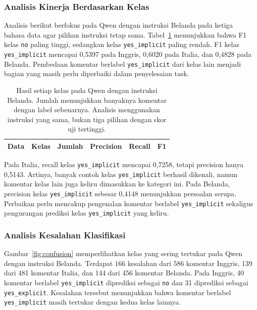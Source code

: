\documentclass[11pt]{article}
\begin{document}
\subsubsection{Analisis Kinerja Berdasarkan Kelas}
Analisis berikut berfokus pada Qwen dengan instruksi Belanda pada ketiga bahasa data agar pilihan instruksi tetap sama. Tabel~\ref{tab:classes} menunjukkan bahwa F1 kelas \texttt{no} paling tinggi, sedangkan kelas \texttt{yes\_implicit} paling rendah. F1 kelas \texttt{yes\_implicit} mencapai 0,5397 pada Inggris, 0,6020 pada Italia, dan 0,4828 pada Belanda. Pembedaan komentar berlabel \texttt{yes\_implicit} dari kelas lain menjadi bagian yang masih perlu diperbaiki dalam penyelesaian task.

\begin{table}[t]
\centering
\begin{tabular}{llrrrr}
\toprule
Data & Kelas & Jumlah & Precision & Recall & F1 \\
\midrule

\end{tabular}
\caption{Hasil setiap kelas pada Qwen dengan instruksi Belanda. Jumlah menunjukkan banyaknya komentar dengan label sebenarnya. Analisis menggunakan instruksi yang sama, bukan tiga pilihan dengan skor uji tertinggi.}
\label{tab:classes}
\end{table}

Pada Italia, recall kelas \texttt{yes\_implicit} mencapai 0,7258, tetapi precision hanya 0,5143. Artinya, banyak contoh kelas \texttt{yes\_implicit} berhasil dikenali, namun komentar kelas lain juga keliru dimasukkan ke kategori ini. Pada Belanda, precision kelas \texttt{yes\_implicit} sebesar 0,4148 menunjukkan persoalan serupa. Perbaikan perlu mencakup pengenalan komentar berlabel \texttt{yes\_implicit} sekaligus pengurangan prediksi kelas \texttt{yes\_implicit} yang keliru.

\subsubsection{Analisis Kesalahan Klasifikasi}
Gambar~\ref{fig:confusion} memperlihatkan kelas yang sering tertukar pada Qwen dengan instruksi Belanda. Terdapat 166 kesalahan dari 586 komentar Inggris, 139 dari 481 komentar Italia, dan 144 dari 456 komentar Belanda. Pada Inggris, 40 komentar berlabel \texttt{yes\_implicit} diprediksi sebagai \texttt{no} dan 31 diprediksi sebagai \texttt{yes\_explicit}. Kesalahan tersebut menunjukkan bahwa komentar berlabel \texttt{yes\_implicit} masih tertukar dengan kedua kelas lainnya.
\end{document}
